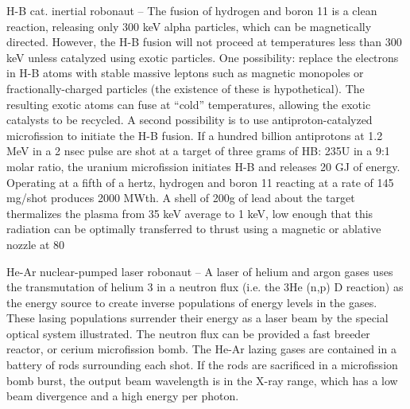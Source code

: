 \documentclass[a4paper]{book}
\begin{document}
H-B cat. inertial robonaut – The fusion of hydrogen and boron 11 is a clean reaction, releasing only 300 keV alpha particles, which can be magnetically directed. However, the H-B fusion will not proceed at temperatures less than 300 keV unless catalyzed using exotic particles. One possibility: replace the electrons in H-B atoms with stable massive leptons such as magnetic monopoles or fractionally-charged particles (the existence of these is hypothetical). The resulting exotic atoms can fuse at “cold” temperatures, allowing the exotic catalysts to be recycled. A second possibility is to use antiproton-catalyzed microfission to initiate the H-B fusion. If a hundred billion antiprotons at 1.2 MeV in a 2 nsec pulse are shot at a target of three grams of HB: 235U in a 9:1 molar ratio, the uranium microfission initiates H-B and releases 20 GJ of energy.  Operating at a fifth of a hertz, hydrogen and boron 11 reacting at a rate of 145 mg/shot produces 2000 MWth. A shell of 200g of lead about the target thermalizes the plasma from 35 keV average to 1 keV, low enough that this radiation can be optimally transferred to thrust using a magnetic or ablative nozzle at 80%
 
He-Ar nuclear-pumped laser robonaut – A laser of helium and argon gases uses the transmutation of helium 3 in a neutron flux (i.e. the 3He (n,p) D reaction) as the energy source to create inverse populations of energy levels in the gases. These lasing populations surrender their energy as a laser beam by the special optical system illustrated. The neutron flux can be provided a fast breeder reactor, or cerium microfission bomb. The He-Ar lazing gases are contained in a battery of rods surrounding each shot. If the rods are sacrificed in a microfission bomb burst, the output beam wavelength is in the X-ray range, which has a low beam divergence and a high energy per photon.
 
\end{document}
